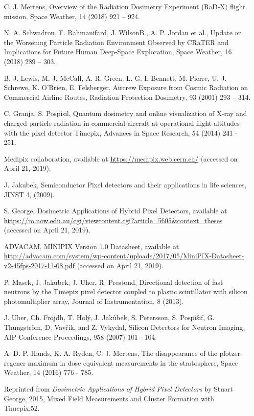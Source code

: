 \begin{thebibliography}{00}
 C. J. Mertens, Overview of the Radiation Dosimetry Experiment (RaD‐X) flight mission, Space Weather, 14 (2018) 921 – 924.  
  
 N. A. Schwadron, F. Rahmanifard, J. WilsonB., A. P. Jordan et al., Update on the Worsening Particle Radiation Environment Observed by CRaTER and Implications for Future Human Deep‐Space Exploration, Space Weather, 16 (2018) 289 – 303.  
  
 B. J. Lewis, M. J. McCall, A. R. Green, L. G. I. Bennett, M. Pierre, U. J. Schrewe, K. O'Brien, E. Felsberger, Aircrew Exposure from Cosmic Radiation on Commercial Airline Routes, Radiation Protection Dosimetry, 93 (2001) 293 – 314.
  
 C. Granja, S. Pospisil, Quantum dosimetry and online visualization of X-ray and charged particle radiation in commercial aircraft at operational flight altitudes with the pixel detector Timepix, Advances in Space Research, 54 (2014) 241 - 251.

  Medipix collaboration, available at \url{https://medipix.web.cern.ch/} (accessed on April 21, 2019).

  J. Jakubek, Semiconductor Pixel detectors and their applications in life sciences, JINST 4, (2009).
  
  S. George, Dosimetric Applications of Hybrid Pixel Detectors, available at \url{https://ro.uow.edu.au/cgi/viewcontent.cgi?article=5605&context=theses} (accessed on April 21, 2019).

  ADVACAM, MINIPIX Version 1.0 Datasheet, available at \url{http://advacam.com/system/wp-content/uploads/2017/05/MiniPIX-Datasheet-v2-45fps-2017-11-08.pdf} (accessed on April 21, 2019).  

  P. Masek, J. Jakubek, J. Uher, R. Prestond, Directional detection of fast neutrons by the Timepix pixel detector coupled to plastic scintillator with silicon photomultiplier array, Journal of Instrumentation, 8 (2013).

  J. Uher, Ch. Fröjdh, T. Holý, J. Jakůbek, S. Petersson, S. Pospíšif, G. Thungström, D. Vavřík, and Z. Vykydal, Silicon Detectors for Neutron Imaging, AIP Conference Proceedings, 958 (2007) 101 - 104.

  A. D. P. Hands, K. A. Ryden, C. J. Mertens, The disappearance of the pfotzer-regener maximum in dose equivalent measurements in the stratosphere, Space Weather, 14 (2016) 776 - 785.

	Reprinted from \textit{Dosimetric Applications of Hybrid Pixel Detectors} by Stuart George, 2015, Mixed Field Measurements and Cluster Formation with Timepix,52.

\end{thebibliography}
